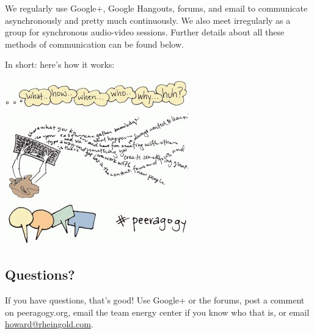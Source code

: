 We regularly use Google+, Google Hangouts, forums, and email to
communicate asynchronously and pretty much continuously. We also meet
irregularly as a group for synchronous audio-video sessions. Further
details about all these methods of communication can be found below.

In short: here's how it works:


\begin{center}
\includegraphics{../pictures/questions.jpg} \\
\includegraphics{../pictures/create_content.jpg} \\
\includegraphics{../pictures/communicate.jpg} \\
\end{center}

\subsection{Questions?}

If you have questions, that's good! Use Google+ or the forums, post a
comment on peeragogy.org, email the team energy center if you know who that
is, or email \href{mailto:howard@rheingold.com}{howard@rheingold.com}.
